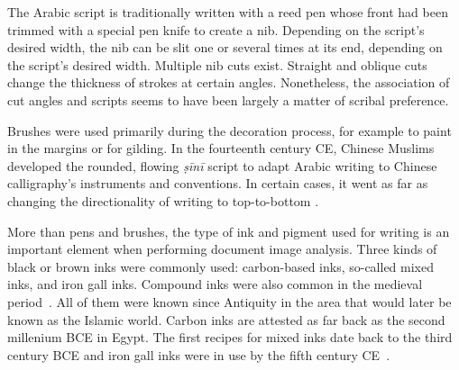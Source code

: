 The Arabic script is traditionally written with a reed pen whose front had been
trimmed with a special pen knife to create a nib. Depending on the script’s
desired width, the nib can be slit one or several times at its end, depending
on the script’s desired width. Multiple nib cuts exist. Straight and oblique
cuts change the thickness of strokes at certain angles. Nonetheless, the
association of cut angles and scripts seems to have been largely a matter of
scribal preference\cite[pg. 42]{gacek2009arabic}.

Brushes were used primarily during the decoration process, for example to paint
in the margins or for gilding. In the fourteenth century CE, Chinese Muslims
developed the rounded, flowing \emph{ṣīnī} script to adapt Arabic writing to
Chinese calligraphy’s instruments and conventions. In certain cases, it went as
far as changing the directionality of writing to top-to-bottom \cite[pg.
29-0]{ghoname2012sini}.

More than pens and brushes, the type of ink and pigment used for writing is an
important element when performing document image analysis. Three kinds of black
or brown inks were commonly used: carbon-based inks, so-called mixed inks, and
iron gall inks. Compound inks were also common in the medieval period~\cite[pg.
62-63]{blair2006islamic}. All of them were known since Antiquity in the area
that would later be known as the Islamic world. Carbon inks are attested as far
back as the second millenium BCE in Egypt. The first recipes for mixed inks
date back to the third century BCE and iron gall inks were in use by the fifth
century CE~\cite{christiansen2017manufacture}.

